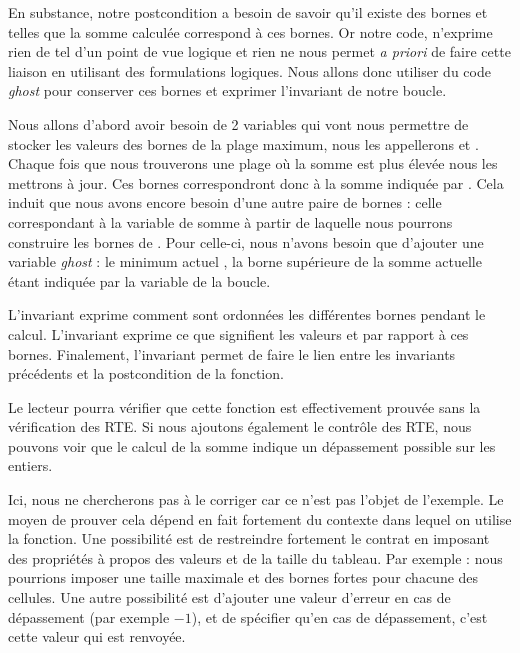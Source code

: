 En substance, notre postcondition a besoin de savoir qu'il existe des
bornes  et  telles que la somme calculée correspond à ces bornes.
Or notre code, n'exprime rien de tel d'un point de vue logique et rien ne nous
permet \textit{a priori} de faire cette liaison en utilisant des formulations logiques.
Nous allons donc utiliser du code \textit{ghost} pour conserver ces bornes et exprimer
l'invariant de notre boucle.



Nous allons d'abord avoir besoin de 2 variables qui vont nous permettre de stocker
les valeurs des bornes de la plage maximum, nous les appellerons 
et . Chaque fois que nous trouverons une plage où la somme est plus
élevée nous les mettrons à jour. Ces bornes correspondront donc à la somme indiquée
par . Cela induit que nous avons encore besoin d'une autre paire de
bornes : celle correspondant à la variable de somme  à partir de laquelle
nous pourrons construire les bornes de . Pour celle-ci, nous n'avons
besoin que d'ajouter une variable \textit{ghost} : le minimum actuel , la
borne supérieure de la somme actuelle étant indiquée par la variable  de la
boucle.






L'invariant  exprime comment sont ordonnées les différentes bornes
pendant le calcul. L'invariant  exprime ce que signifient les
valeurs  et  par rapport à ces bornes. Finalement,
l'invariant  permet de faire le lien entre les invariants précédents
et la postcondition de la fonction.



Le lecteur pourra vérifier que cette fonction est effectivement prouvée sans la
vérification des RTE. Si nous ajoutons également le contrôle des RTE, nous pouvons
voir que le calcul de la somme indique un dépassement possible sur les entiers.



Ici, nous ne chercherons pas à le corriger car ce n'est pas l'objet de l'exemple.
Le moyen de prouver cela dépend en fait fortement du contexte dans lequel on
utilise la fonction. Une possibilité est de restreindre fortement le contrat en
imposant des propriétés à propos des valeurs et de la taille du tableau. Par
exemple : nous pourrions imposer une taille maximale et des bornes fortes pour
chacune des cellules. Une autre possibilité est d'ajouter une valeur d'erreur
en cas de dépassement (par exemple $-1$), et de spécifier qu'en cas de
dépassement, c'est cette valeur qui est renvoyée.



